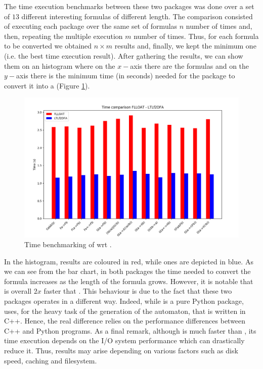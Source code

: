 The time execution benchmarks between these two packages was done over a set of $13$ different interesting \LTLf formulas of different length.
The comparison consisted of executing each package over the same set of formulas $n$ number of times and, then, repeating the multiple execution $m$ number of times. Thus, for each formula to be converted we obtained $n \times m$ results and, finally, we kept the minimum one (i.e. the best time execution result).
After gathering the results, we can show them on an histogram where on the $x-$axis there are the \LTLf formulas and on the $y-$axis there is the minimum time (in seconds) needed for the package to convert it into a \DFA (Figure \ref{fig:time-comparison}).
\begin{figure}[h]
\centering
\includegraphics[width=\linewidth]{images/time-comparison.png}
\caption{Time benchmarking of \LTLfToDFA wrt \FLLOAT.} 
\label{fig:time-comparison}
\end{figure}
In the histogram, \FLLOAT results are coloured in red, while \LTLfToDFA ones are depicted in blue. As we can see from the bar chart, in both packages the time needed to convert the formula increases as the length of the formula grows. However, it is notable that \LTLfToDFA is overall $2x$ faster that \FLLOAT.
This behaviour is due to the fact that these two packages operates in a different way. Indeed, while \FLLOAT is a pure Python package, \LTLfToDFA uses, for the heavy task of the generation of the automaton, \MONA that is written in C++. Hence, the real difference relies on the performance differences between C++ and Python programs.
As a final remark, although \LTLfToDFA is much faster than \FLLOAT, its time execution depends on the I/O system performance which can drastically reduce it. Thus, \LTLfToDFA results may arise depending on various factors such as disk speed, caching and filesystem.
